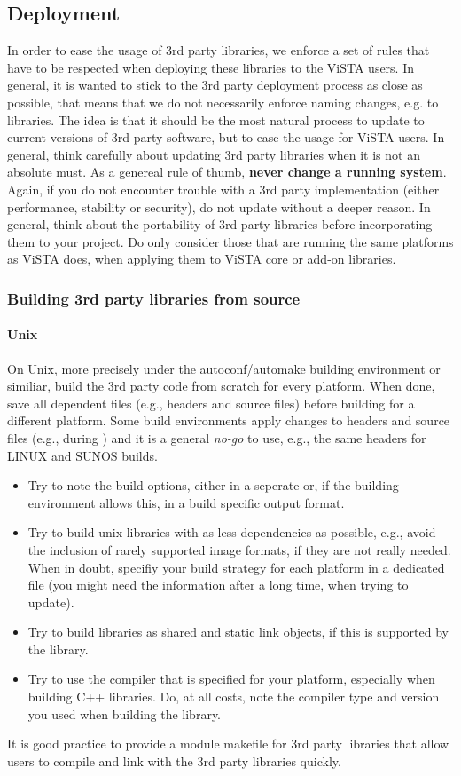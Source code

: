 \subsection{Deployment}
In order to ease the usage of 3rd party libraries, we enforce a set of rules that have to be respected when deploying these libraries to the ViSTA users.
In general, it is wanted to stick to the 3rd party deployment process as close as possible, that means that we do not necessarily enforce naming changes, e.g. to libraries.
The idea is that it should be the most natural process to update to current versions of 3rd party software, but to ease the usage for ViSTA users.
In general, think carefully about updating 3rd party libraries when it is not an absolute must.
As a genereal rule of thumb, \textbf{never change a running system}.
Again, if you do not encounter trouble with a 3rd party implementation (either performance, stability or security), do not update without a deeper reason.
In general, think about the portability of 3rd party libraries before incorporating them to your project.
Do only consider those that are running the same platforms as ViSTA does, when applying them to ViSTA core or add-on libraries.


\subsubsection{Building 3rd party libraries from source}
\paragraph{Unix}
On Unix, more precisely under the autoconf/automake building environment or similiar, build the 3rd party code from scratch for every platform.
When done, save all dependent files (e.g., headers and source files) before building for a different platform.
Some build environments apply changes to headers and source files (e.g., during ) and it is a general \emph{no-go} to use, e.g., the same headers for LINUX and SUNOS builds.
\begin{itemize}
\item Try to note the build options, either in a seperate  or, if the building environment allows this, in a build specific output format.
\item Try to build unix libraries with as less dependencies as possible, e.g., avoid the inclusion of rarely supported image formats, if they are not really needed.
When in doubt, specifiy your build strategy for each platform in a dedicated file (you might need the information after a long time, when trying to update).
\item Try to build libraries as shared and static link objects, if this is supported by the library.
\item Try to use the compiler that is specified for your platform, especially when building C++ libraries.
Do, at all costs, note the compiler type and version you used when building the library.
\end{itemize}
It is good practice to provide a module makefile for 3rd party libraries that allow users to compile and link with the 3rd party libraries quickly.

